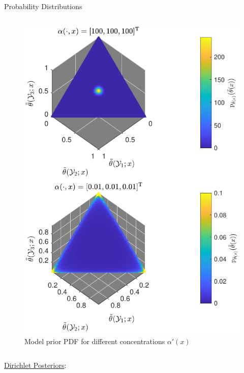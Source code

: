 \documentclass[final]{beamer}
\begin{document}
\begin{frame}{}
\begin{columns}[T]
\begin{column}{.34\linewidth}
\begin{block}{Probability Distributions}
\begin{columns}[c]
\begin{column}{.44\linewidth}
\begin{figure}
\centering
\includegraphics[width=0.9\linewidth]{P_theta_tilde.pdf}
\caption{Model prior PDF for different concentrations $\alpha'(x)$}
\label{fig:P_theta}
\end{figure}

\end{column}
\end{columns}



\vspace{1cm}




\begin{columns}[c]
\begin{column}{.49\linewidth}

\underline{Dirichlet Posteriors}:


\end{column}
\end{columns}
\end{block}
\end{column}
\end{columns}
\end{frame}
\end{document}
